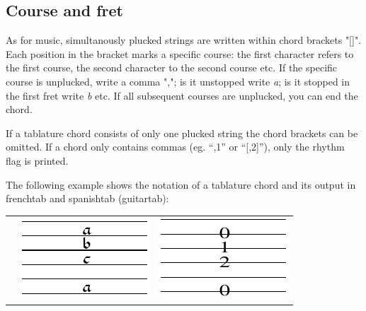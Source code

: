 \documentclass[a4paper]{article}
\begin{document}
\subsection{Course and fret}
As for music, simultanously plucked strings are written within 
chord brackets "[]". Each position in the bracket marks a specific
course: the first character refers to the first course, the second
character to the second course etc. If the specific course is
unplucked, write a comma ","; is it unstopped write {\it a}; is it
stopped in the first fret write {\it b} etc. If all subsequent courses
are unplucked, you can end the chord.
\par
If a tablature chord consists of only one plucked string the chord
brackets can be omitted. If a chord only contains commas (eg. ``,1'' or
``[,2]''), only the rhythm flag is printed.
\par
The following example shows the notation of a tablature chord and
its output in frenchtab and spanishtab (guitartab):

\begin{center}
\begin{tabular}{lll}
\raisebox{5ex}{\tt [,abc,a] } & 
	\includegraphics{sample5a} & 
	\includegraphics{sample5b} \\ 
\end{tabular}
\end{center}
\end{document}
